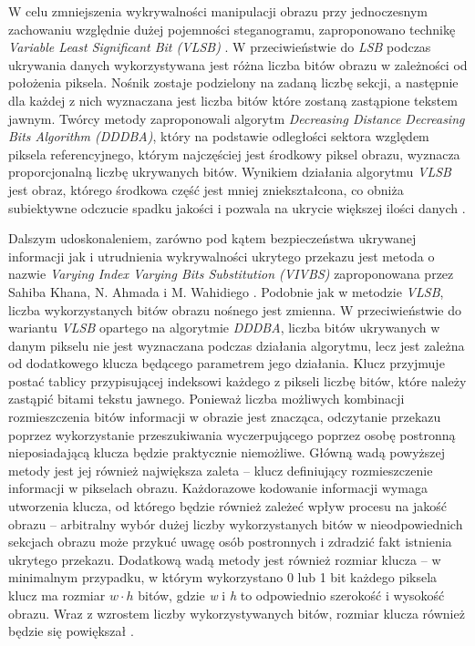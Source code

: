 {{{            %
            W celu zmniejszenia wykrywalności manipulacji obrazu przy jednoczesnym zachowaniu względnie dużej pojemności
            steganogramu, zaproponowano technikę \textit{Variable Least Significant Bit
            \textnormal{(}VLSB\textnormal{)}} \cite{Khan2011ImplementationOV}. W przeciwieństwie do \textit{LSB} podczas
            ukrywania danych wykorzystywana jest różna liczba bitów obrazu w zależności od położenia piksela. Nośnik
            zostaje podzielony na zadaną liczbę sekcji, a następnie dla każdej z nich wyznaczana jest liczba bitów które
            zostaną zastąpione tekstem  jawnym. Twórcy metody zaproponowali algorytm \textit{Decreasing Distance
            Decreasing Bits Algorithm \textnormal{(}DDDBA\textnormal{)}}, który na podstawie odległości sektora
            względem piksela referencyjnego, którym najczęściej jest środkowy piksel obrazu, wyznacza proporcjonalną
            liczbę ukrywanych bitów. Wynikiem działania algorytmu \textit{VLSB} jest obraz, którego środkowa część jest
            mniej zniekształcona, co obniża subiektywne odczucie spadku jakości i pozwala na  ukrycie większej ilości
            danych \cite{Khan2011ImplementationOV}.

            Dalszym udoskonaleniem, zarówno pod kątem bezpieczeństwa ukrywanej informacji jak i utrudnienia
            wykrywalności  ukrytego przekazu jest metoda o nazwie \textit{Varying Index Varying Bits Substitution
            \textnormal{(}VIVBS\textnormal{)}} zaproponowana przez Sahiba Khana, N. Ahmada i M. Wahidiego
            \cite{Khan2016VaryingIV}. Podobnie jak w metodzie \textit{VLSB}, liczba wykorzystanych bitów obrazu nośnego
            jest zmienna. W przeciwieństwie do wariantu \textit{VLSB} opartego na algorytmie \textit{DDDBA}, liczba
            bitów ukrywanych w danym pikselu nie jest wyznaczana podczas działania algorytmu, lecz jest zależna od
            dodatkowego klucza będącego parametrem jego działania. Klucz przyjmuje postać tablicy  przypisującej
            indeksowi każdego z pikseli liczbę bitów, które należy zastąpić bitami tekstu jawnego. Ponieważ liczba
            możliwych kombinacji rozmieszczenia bitów informacji w obrazie jest znacząca, odczytanie przekazu poprzez
            wykorzystanie przeszukiwania wyczerpującego poprzez osobę postronną nieposiadającą klucza będzie praktycznie
            niemożliwe. Główną wadą powyższej metody jest jej również największa zaleta -- klucz definiujący
            rozmieszczenie  informacji w pikselach obrazu. Każdorazowe kodowanie informacji wymaga utworzenia klucza, od
            którego będzie  również zależeć wpływ procesu na jakość obrazu -- arbitralny wybór dużej liczby
            wykorzystanych bitów w  nieodpowiednich sekcjach obrazu może przykuć uwagę osób postronnych i zdradzić fakt
            istnienia ukrytego przekazu.  Dodatkową wadą metody jest również rozmiar klucza --  w minimalnym przypadku,
            w którym wykorzystano 0 lub 1 bit każdego piksela klucz ma rozmiar $w \cdot h$ bitów, gdzie \textit{w} i
            \textit{h} to odpowiednio szerokość i  wysokość obrazu. Wraz z wzrostem liczby wykorzystywanych bitów,
            rozmiar klucza również będzie się powiększał \cite{Khan2016VaryingIV}.

}}}
